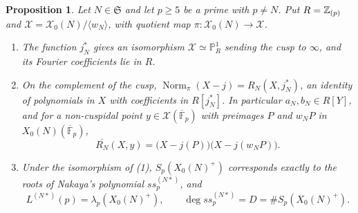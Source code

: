 \documentclass[11pt,a4paper]{article}
\newtheorem{proposition}[theorem]{Proposition}
\theoremstyle{remark}\newtheorem{remark}[theorem]{Remark}
\numberwithin{equation}{section}
\newcommand{\kk}{\overline{\mathbb F}_p}
\begin{document}
	\begin{proposition}\label{prop:coordinate}
		Let $N\in\mathfrak S$ and let $p\geq5$ be a prime with $p\neq N$. Put $R=\mathbb Z_{(p)}$ and $\mathscr X=\mathscr X_0(N)/\langle w_N\rangle$, with quotient map $\pi\colon\mathscr X_0(N)\to\mathscr X$.
		\begin{enumerate}
			\item The function $j_N^*$ gives an isomorphism $\mathscr X\simeq\mathbb P^1_R$ sending the cusp to $\infty$, and its Fourier coefficients lie in $R$.
			\item On the complement of the cusp, $\operatorname{Norm}_\pi(X-j)=R_N(X,j_N^*)$, an identity of polynomials in $X$ with coefficients in $R[j_N^*]$. In particular $a_N,b_N\in R[Y]$, and for a non-cuspidal point $y\in\mathscr X(\kk)$ with preimages $P$ and $w_NP$ in $X_0(N)(\kk)$,
			\[
			\overline{R_N}(X,y)=\bigl(X-j(P)\bigr)\bigl(X-j(w_NP)\bigr).
			\]
			\item Under the isomorphism of \textup{(1)}, $S_p(X_0(N)^+)$ corresponds exactly to the roots of Nakaya's polynomial $ss_p^{(N*)}$, and
			\begin{equation}\label{eq:identify}
				L^{(N*)}(p)=\lambda_p(X_0(N)^+),\qquad \deg ss_p^{(N*)}=D=\#S_p(X_0(N)^+).
			\end{equation}
		\end{enumerate}
	\end{proposition}
\end{document}
